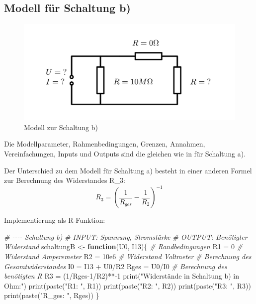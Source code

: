 \documentclass[
  9pt,
]{article}
\newenvironment{Shaded}{\begin{snugshade}}{\end{snugshade}}
\newcommand{\CommentTok}[1]{\textcolor[rgb]{0.56,0.35,0.01}{\textit{#1}}}
\newcommand{\ControlFlowTok}[1]{\textcolor[rgb]{0.13,0.29,0.53}{\textbf{#1}}}
\newcommand{\DecValTok}[1]{\textcolor[rgb]{0.00,0.00,0.81}{#1}}
\newcommand{\FloatTok}[1]{\textcolor[rgb]{0.00,0.00,0.81}{#1}}
\newcommand{\FunctionTok}[1]{\textcolor[rgb]{0.00,0.00,0.00}{#1}}
\newcommand{\NormalTok}[1]{#1}
\newcommand{\OtherTok}[1]{\textcolor[rgb]{0.56,0.35,0.01}{#1}}
\newcommand{\SpecialCharTok}[1]{\textcolor[rgb]{0.00,0.00,0.00}{#1}}
\newcommand{\StringTok}[1]{\textcolor[rgb]{0.31,0.60,0.02}{#1}}
\begin{document}
\hypertarget{modell-fuxfcr-schaltung-b}{%
\subsection{Modell für Schaltung b)}\label{modell-fuxfcr-schaltung-b}}

\begin{figure}
\centering
\includegraphics[width=\textwidth,height=0.2\textheight]{Bilder/ModellB.png}
\caption{Modell zur Schaltung b)}
\end{figure}

Die Modellparameter, Rahmenbedingungen, Grenzen, Annahmen,
Vereinfachungen, Inputs und Outputs sind die gleichen wie in für
Schaltung a).

Der Unterschied zu dem Modell für Schaltung a) besteht in einer anderen
Formel zur Berechnung des Widerstandes R\_3:
\[R_3=(\frac{1}{R_{ges}}-\frac{1}{R_2})^{-1}\]

Implementierung als R-Funktion:

\begin{Shaded}
\begin{Highlighting}[]
\CommentTok{\# {-}{-}{-}{-} Schaltung b)}
\CommentTok{\# INPUT: Spannung, Stromstärke}
\CommentTok{\# OUTPUT: Benötigter Widerstand}
\NormalTok{schaltungB }\OtherTok{\textless{}{-}} \ControlFlowTok{function}\NormalTok{(U0, I13)\{}
  \CommentTok{\# Randbedingungen}
\NormalTok{  R1 }\OtherTok{=} \DecValTok{0} \CommentTok{\# Widerstand Amperemeter}
\NormalTok{  R2 }\OtherTok{=} \FloatTok{10e6} \CommentTok{\# Widerstand Voltmeter}
  \CommentTok{\# Berechnung des Gesamtwiderstandes}
\NormalTok{  I0 }\OtherTok{=}\NormalTok{ I13 }\SpecialCharTok{+}\NormalTok{ U0}\SpecialCharTok{/}\NormalTok{R2}
\NormalTok{  Rges }\OtherTok{=}\NormalTok{ U0}\SpecialCharTok{/}\NormalTok{I0}
  \CommentTok{\# Berechnung des benötigten R}
\NormalTok{  R3 }\OtherTok{=}\NormalTok{ (}\DecValTok{1}\SpecialCharTok{/}\NormalTok{Rges}\DecValTok{{-}1}\SpecialCharTok{/}\NormalTok{R2)}\SpecialCharTok{**{-}}\DecValTok{1}
  \FunctionTok{print}\NormalTok{(}\StringTok{"Widerstände in Schaltung b) in Ohm:"}\NormalTok{)}
  \FunctionTok{print}\NormalTok{(}\FunctionTok{paste}\NormalTok{(}\StringTok{"R1: "}\NormalTok{, R1))}
  \FunctionTok{print}\NormalTok{(}\FunctionTok{paste}\NormalTok{(}\StringTok{"R2: "}\NormalTok{, R2))}
  \FunctionTok{print}\NormalTok{(}\FunctionTok{paste}\NormalTok{(}\StringTok{"R3: "}\NormalTok{, R3))}
  \FunctionTok{print}\NormalTok{(}\FunctionTok{paste}\NormalTok{(}\StringTok{"R\_ges: "}\NormalTok{, Rges))}
\NormalTok{\}}
\end{Highlighting}
\end{Shaded}
\end{document}
